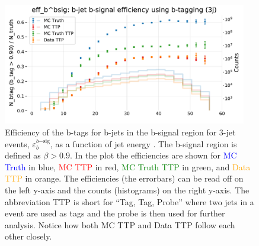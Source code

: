\documentclass[a4paper, twoside, nobib]{tufte-book}
\newcommand{\code}[1]{\colorbox{light-gray}{\texttt{\detokenize{#1}}}}
\newcommand{\q}[1]{``#1''}
\begin{document}
\begin{figure}
  \includegraphics[width=0.95\textwidth, trim=0 0 0 40, clip]{figures/quarks/eff_b_bsig-down_sample=1.00-ML_vars=vertex-selection=b-ejet_min=4-n_iter_RS_lgb=99-n_iter_RS_xgb=9-cdot_cut=0.90-version=19.pdf}
  \caption[b-Tagging Efficiency $\varepsilon_b^{b\mathrm{-sig}}$ as a function of jet energy]
          {Efficiency of the b-tags for b-jets in the b-signal region for 3-jet events, $\varepsilon_b^{b\mathrm{-sig}}$, as a function of jet energy \code{Ejet}. The b-signal region is defined as $\beta > 0.9$. In the plot the efficiencies are shown for \textcolor{blue}{MC Truth} in blue, \textcolor{red}{MC TTP} in red, \textcolor{green}{MC Truth TTP} in green, and \textcolor{orange}{Data TTP} in orange. The efficiencies (the errorbars) can be read off on the left y-axis and the counts (histograms) on the right y-axis. The abbreviation TTP is short for \q{Tag, Tag, Probe} where two jets in a event are used as tags and the probe is then used for further analysis. Notice how both MC TTP and Data TTP follow each other closely.  
          } 
  \label{fig:q:effiency_btag_bjet_bsig}
\end{figure}
\end{document}
